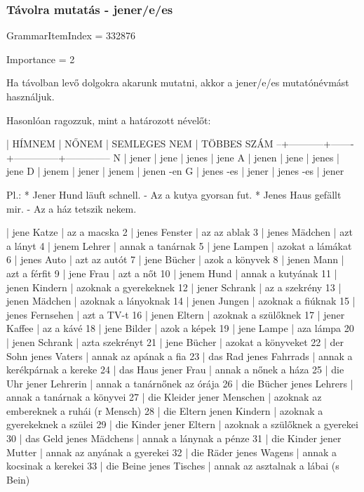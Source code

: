 \documentclass{article}
\newenvironment{desc}{\verbatim}{\endverbatim}
\newenvironment{exmp}{\verbatim}{\endverbatim}
\begin{document}
\subsubsection{Távolra mutatás - jener/e/es}

GrammarItemIndex = 332876

Importance = 2

\begin{desc}
Ha távolban levő dolgokra akarunk mutatni, akkor a jener/e/es mutatónévmást használjuk.

Hasonlóan ragozzuk, mint a határozott névelőt:

  | HÍMNEM    | NŐNEM | SEMLEGES NEM | TÖBBES SZÁM
--+-----------+-------+--------------+--------------
N | jener     | jene  | jenes        | jene
A | jenen     | jene  | jenes        | jene
D | jenem     | jener | jenem        | jenen -en
G | jenes -es | jener | jenes -es    | jener

Pl.: * Jener Hund läuft schnell. - Az a kutya gyorsan fut.
* Jenes Haus gefällt mir. - Az a ház tetszik nekem.
\end{desc}

\begin{exmp}
1 | jene Katze | az a macska
2 | jenes Fenster | az az ablak
3 | jenes Mädchen | azt a lányt
4 | jenem Lehrer | annak a tanárnak
5 | jene Lampen | azokat a lámákat
6 | jenes Auto | azt az autót
7 | jene Bücher | azok a könyvek
8 | jenen Mann | azt a férfit
9 | jene Frau | azt a nőt
10 | jenem Hund | annak a kutyának
11 | jenen Kindern | azoknak a gyerekeknek
12 | jener Schrank | az a szekrény
13 | jenen Mädchen | azoknak a lányoknak
14 | jenen Jungen | azoknak  a fiúknak
15 | jenes Fernsehen | azt a TV-t
16 | jenen Eltern | azoknak a szülőknek
17 | jener Kaffee | az a kávé
18 | jene Bilder | azok a képek
19 | jene Lampe | aza lámpa
20 | jenen Schrank | azta szekrényt
21 | jene Bücher | azokat a könyveket
22 | der Sohn jenes Vaters | annak az apának a fia
23 | das Rad jenes Fahrrads | annak a kerékpárnak a kereke
24 | das Haus jener Frau | annak a nőnek a háza
25 | die Uhr jener Lehrerin | annak a tanárnőnek az órája
26 | die Bücher jenes Lehrers | annak a tanárnak a könyvei
27 | die Kleider jener Menschen | azoknak az embereknek a ruhái (r Mensch)
28 | die Eltern jenen Kindern | azoknak a gyerekeknek a szülei
29 | die Kinder jener Eltern | azoknak a szülőknek a gyerekei
30 | das Geld jenes Mädchens | annak a lánynak a pénze
31 | die Kinder jener Mutter | annak az anyának a gyerekei
32 | die Räder jenes Wagens | annak a kocsinak a kerekei
33 | die Beine jenes Tisches | annak az asztalnak a lábai (s Bein)
\end{exmp}
\end{document}
